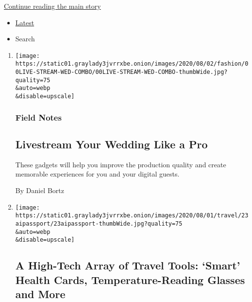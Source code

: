 \protect\hyperlink{after-mid2}{Continue reading the main story}

\begin{itemize}
\tightlist
\item
  \protect\hyperlink{stream-panel}{Latest}
\item
  Search
\end{itemize}

\begin{enumerate}
\def\labelenumi{\arabic{enumi}.}
\item
  \href{/2020/07/28/fashion/weddings/livestream-your-wedding-like-a-pro.html}{}

  \texttt{[image: https://static01.graylady3jvrrxbe.onion/images/2020/08/02/fashion/00LIVE-STREAM-WED-COMBO/00LIVE-STREAM-WED-COMBO-thumbWide.jpg?quality=75\\\&auto=webp\\\&disable=upscale]}

  \hypertarget{field-notes}{%
  \subsubsection{Field Notes}\label{field-notes}}

  \hypertarget{livestream-your-wedding-like-a-pro}{%
  \subsection{Livestream Your Wedding Like a
  Pro}\label{livestream-your-wedding-like-a-pro}}

  These gadgets will help you improve the production quality and create
  memorable experiences for you and your digital guests.

  By Daniel Bortz
\item
  \href{/2020/07/23/travel/artificial-intelligence-coronavirus-passport.html}{}

  \texttt{[image: https://static01.graylady3jvrrxbe.onion/images/2020/08/01/travel/23aipassport/23aipassport-thumbWide.jpg?quality=75\\\&auto=webp\\\&disable=upscale]}

  \hypertarget{a-high-tech-array-of-travel-tools-smart-health-cards-temperature-reading-glasses-and-more}{%
  \subsection{A High-Tech Array of Travel Tools: `Smart' Health Cards,
  Temperature-Reading Glasses and
  More}\label{a-high-tech-array-of-travel-tools-smart-health-cards-temperature-reading-glasses-and-more}}


\end{enumerate}

